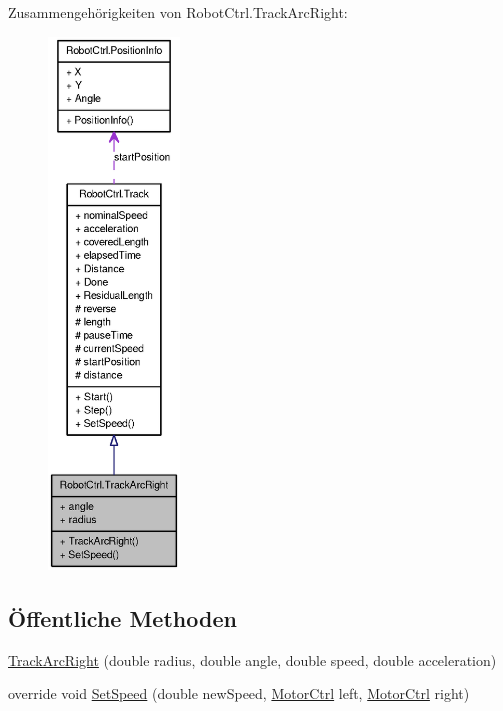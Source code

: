 Zusammengehörigkeiten von RobotCtrl.TrackArcRight:\nopagebreak
\begin{figure}[H]
\begin{center}
\leavevmode
\includegraphics[height=400pt]{class_robot_ctrl_1_1_track_arc_right__coll__graph}
\end{center}
\end{figure}
\subsection*{Öffentliche Methoden}
\begin{DoxyCompactItemize}
\item 
\hyperlink{class_robot_ctrl_1_1_track_arc_right_a54609ff71d77c37e9423cae42de7c347}{TrackArcRight} (double radius, double angle, double speed, double acceleration)
\item 
override void \hyperlink{class_robot_ctrl_1_1_track_arc_right_a7b2db0d3709e4919da0645a6713a87bb}{SetSpeed} (double newSpeed, \hyperlink{class_robot_ctrl_1_1_motor_ctrl}{MotorCtrl} left, \hyperlink{class_robot_ctrl_1_1_motor_ctrl}{MotorCtrl} right)
\end{DoxyCompactItemize}
